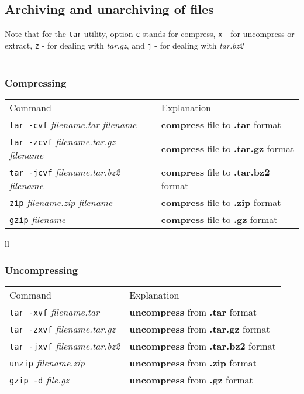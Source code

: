 \subsection{Archiving and unarchiving of files}
Note that for the \texttt{tar} utility, option \texttt{c} stands for compress, 
\texttt{x} - for uncompress or extract, \texttt{z} - for dealing with \textit{tar.gz},
and \texttt{j} - for dealing with \textit{tar.bz2}\\~\\
\subsubsection{Compressing}
\begin{tabular}{ll}
  Command & Explanation \\
  \hhline{==}
  \texttt{tar -cvf} \textit{filename.tar} \textit{filename} & \textbf{compress} file to \textbf{.tar} format \\
  \texttt{tar -zcvf} \textit{filename.tar.gz} \textit{filename} & \textbf{compress} file to \textbf{.tar.gz} format \\
  \texttt{tar -jcvf} \textit{filename.tar.bz2} \textit{filename} & \textbf{compress} file to \textbf{.tar.bz2} format \\
  \texttt{zip} \textit{filename.zip filename} & \textbf{compress} file to \textbf{.zip} format \\
  \texttt{gzip} \textit{filename} & \textbf{compress} file to \textbf{.gz} format \\
\end{tabular}{ll}

\subsubsection{Uncompressing}
\begin{tabular}{ll}
  Command & Explanation \\
  \hhline{==}
  \texttt{tar -xvf} \textit{filename.tar} & \textbf{uncompress} from \textbf{.tar} format \\
  \texttt{tar -zxvf} \textit{filename.tar.gz} & \textbf{uncompress} from \textbf{.tar.gz} format \\
  \texttt{tar -jxvf} \textit{filename.tar.bz2} & \textbf{uncompress} from \textbf{.tar.bz2} format \\
  \texttt{unzip} \textit{filename.zip} & \textbf{uncompress} from \textbf{.zip} format \\
  \texttt{gzip -d} \textit{file.gz} & \textbf{uncompress} from \textbf{.gz} format \\
\end{tabular}

